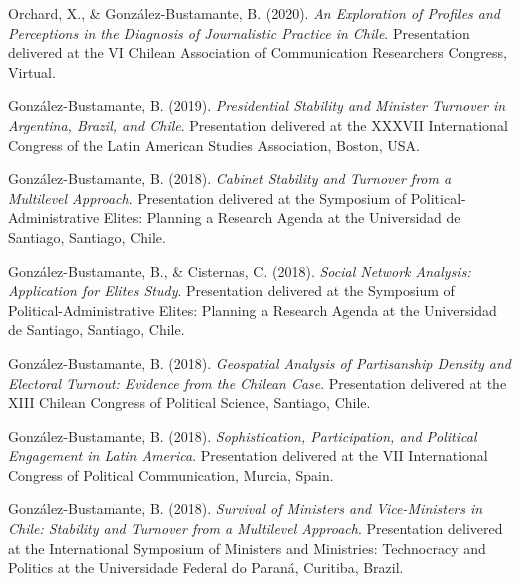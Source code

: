 \begin{publications}
\begin{benumerate}{66}
\item{\small Orchard, X., \& González-Bustamante, B. (2020). {\itshape An Exploration of Profiles and Perceptions in the Diagnosis of Journalistic Practice in Chile}. Presentation delivered at the VI Chilean Association of Communication Researchers Congress, Virtual.}\vspace{1mm}

\item{\small González-Bustamante, B. (2019). {\itshape Presidential Stability and Minister Turnover in Argentina, Brazil, and Chile}. Presentation delivered at the XXXVII International Congress of the Latin American Studies Association, Boston, USA.}\vspace{1mm}

\item{\small González-Bustamante, B. (2018). {\itshape Cabinet Stability and Turnover from a Multilevel Approach}. Presentation delivered at the Symposium of Political-Administrative Elites: Planning a Research Agenda at the Universidad de Santiago, Santiago, Chile.}\vspace{1mm}

\item{\small González-Bustamante, B., \& Cisternas, C. (2018). {\itshape Social Network Analysis: Application for Elites Study}. Presentation delivered at the Symposium of Political-Administrative Elites: Planning a Research Agenda at the Universidad de Santiago, Santiago, Chile.}\vspace{1mm}

\item{\small González-Bustamante, B. (2018). {\itshape Geospatial Analysis of Partisanship Density and Electoral Turnout: Evidence from the Chilean Case}. Presentation delivered at the XIII Chilean Congress of Political Science, Santiago, Chile.}\vspace{1mm}

\item{\small González-Bustamante, B. (2018). {\itshape Sophistication, Participation, and Political Engagement in Latin America}. Presentation delivered at the VII International Congress of Political Communication, Murcia, Spain.}\vspace{1mm}

\item{\small González-Bustamante, B. (2018). {\itshape Survival of Ministers and Vice-Ministers in Chile: Stability and Turnover from a Multilevel Approach}. Presentation delivered at the International Symposium of Ministers and Ministries: Technocracy and Politics at the Universidade Federal do Paraná, Curitiba, Brazil.}\vspace{1mm}


\end{benumerate}
\end{publications}
